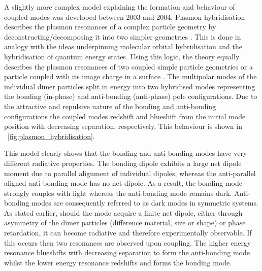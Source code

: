 \documentclass{article}
\begin{document}
A slightly more complex model explaining the formation and behaviour of coupled modes was developed between 2003 and 2004. Plasmon hybridisation describes the plasmon resonances of a complex particle geometry by {\color{red}deconstructing/decomposing} it into two simpler geometries \cite{prodan2003, prodan2004}. This is done in analogy with the ideas underpinning molecular orbital hybridisation and the hybridisation of quantum energy states. Using this logic, the theory equally describes the plasmon resonances of two coupled simple particle geometries \cite{nordlander2004} or a particle coupled with its image charge in a surface \cite{nordlander2004a}. The multipolar modes of the individual dimer particles split in energy into two hybridised modes representing the bonding (in-phase) and anti-bonding (anti-phase) pole configurations. Due to the attractive and repulsive nature of the bonding and anti-bonding configurations the coupled modes redshift and blueshift from the initial mode position with decreasing separation, respectively. This behaviour is shown in \figurename~\ref{fig:plasmon_hybridisation}.

This model clearly shows that the bonding and anti-bonding modes have very different radiative properties. The bonding dipole exhibits a large net dipole moment due to parallel alignment of individual dipoles, whereas the anti-parallel aligned anti-bonding mode has no net dipole. As a result, the bonding mode strongly couples with light whereas the anti-bonding mode remains dark. Anti-bonding modes are consequently referred to as dark modes in symmetric systems. As stated earlier, should the mode acquire a finite net dipole, either through asymmetry of the dimer particles (difference material, size or shape) or phase retardation, it can become radiative and therefore experimentally observable. If this occurs then two resonances are observed upon coupling. The higher energy resonance blueshifts with decreasing separation to form the anti-bonding mode whilst the lower energy resonance redshifts and forms the bonding mode.
\end{document}
